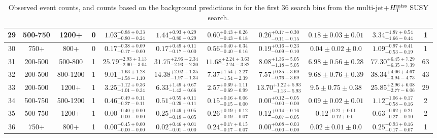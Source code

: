 \begin{table}
{\begin{tabular}{ |c|c|c|c||c|c|c|c|c||c|c| }
29 & 500-750 & 1200+ & 0 & $1.03^{+0.88+0.33}_{-0.80-0.24}$ & $1.44^{+0.93+0.29}_{-0.80-0.29}$ & $0.60^{+0.43+0.26}_{-0.43-0.18}$ & $0.26^{+0.17+0.30}_{-0.11-0.15}$ &$0.18\pm 0.03 \pm0.01$& $3.34^{+1.87+0.54}_{-1.66-0.44}$ & 1 \\ \hline
30 & 750+ & 800+ & 0 & $0.17^{+0.38+0.09}_{-0.17-0.00}$ & $0.17^{+0.49+0.11}_{-0.17-0.00}$ & $0.56^{+0.40+0.34}_{-0.40-0.16}$ & $0.19^{+0.16+0.23}_{-0.09-0.10}$ &$0.04\pm 0.02 \pm0.0$& $1.09^{+0.97+0.41}_{-0.53-0.19}$ & 1 \\ \hline
31 & 200-500 & 500-800 & 1 & $25.79^{+2.93+3.13}_{-2.90-3.04}$ & $31.75^{+2.96+2.34}_{-2.93-2.30}$ & $11.68^{+2.24+3.63}_{-2.24-3.82}$ & $8.08^{+1.36+5.05}_{-1.18-5.05}$ &$6.98\pm 0.56 \pm0.28$& $77.30^{+6.45+7.29}_{-6.35-7.39}$ & 63 \\ \hline
32 & 200-500 & 800-1200 & 1 & $9.01^{+1.63+1.28}_{-1.58-1.10}$ & $14.38^{+2.02+1.35}_{-1.97-1.34}$ & $7.37^{+1.54+2.27}_{-1.54-2.39}$ & $7.57^{+0.85+3.69}_{-0.76-3.69}$ &$9.68\pm 0.76 \pm0.39$& $38.34^{+4.06+4.67}_{-3.94-4.73}$ & 43 \\ \hline
33 & 200-500 & 1200+ & 1 & $3.25^{+1.12+0.36}_{-1.01-0.34}$ & $6.33^{+1.49+0.67}_{-1.42-0.66}$ & $2.57^{+0.69+1.11}_{-0.69-0.99}$ & $13.70^{+1.22+5.93}_{-1.13-5.93}$ &$9.5\pm 0.75 \pm0.38$& $25.85^{+2.96+6.08}_{-2.77-6.06}$ & 29 \\ \hline
34 & 500-750 & 500-1200 & 1 & $0.46^{+0.49+0.11}_{-0.27-0.11}$ & $0.51^{+0.55+0.11}_{-0.29-0.11}$ & $0.15^{+0.16+0.06}_{-0.15-0.00}$ & $0.00^{+0.12+0.05}_{-0.00-0.00}$ &$0.09\pm 0.02 \pm0.01$& $1.12^{+1.06+0.17}_{-0.58-0.16}$ & 2 \\ \hline
35 & 500-750 & 1200+ & 1 & $0.00^{+0.40+0.00}_{-0.00-0.00}$ & $0.25^{+0.49+0.05}_{-0.18-0.05}$ & $0.26^{+0.19+0.12}_{-0.19-0.07}$ & $0.12^{+0.14+0.16}_{-0.07-0.05}$ &$0.12^{+0.21+0.01}_{-0.12+0.0}$& $0.63^{+0.92+0.21}_{-0.27-0.10}$ & 2 \\ \hline
36 & 750+ & 800+ & 1 & $0.00^{+0.45+0.00}_{-0.00-0.00}$ & $0.02^{+0.46+0.01}_{-0.01-0.00}$ & $0.24^{+0.17+0.15}_{-0.17-0.07}$ & $0.00^{+0.08+0.03}_{-0.00-0.00}$ &$0.02\pm 0.01 \pm0.0$& $0.25^{+0.93+0.16}_{-0.17-0.07}$ & 1 \\ \hline
\end{tabular}
}
\caption{Observed event counts, and counts based on the background predictions in for the first 36 search bins from the multi-jet+$H_{\text{T}}^{\rm miss}$ SUSY search.}
\end{table}
